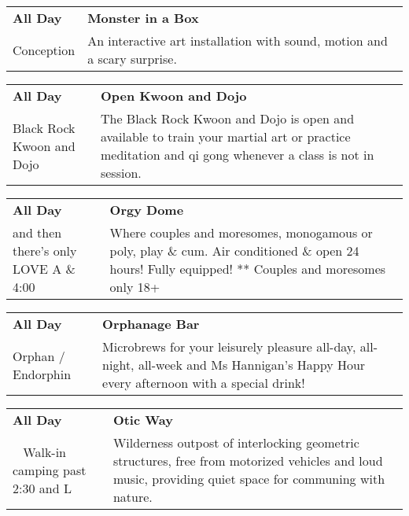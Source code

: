 \begin{tabular}{ p{1in} p{2.2in} }
    \textbf{All Day} & \textbf{Monster in a Box} \\
    Conception \newline  & An interactive art installation with sound, motion and a scary surprise. \\
    \hline 
\end{tabular}
    
\begin{tabular}{ p{1in} p{2.2in} }
    \textbf{All Day} & \textbf{Open Kwoon and Dojo} \\
    Black Rock Kwoon and Dojo \newline  & The Black Rock Kwoon and Dojo is open and available to train your martial art or practice meditation and qi gong whenever a class is not in session. \\
    \hline 
\end{tabular}
    
\begin{tabular}{ p{1in} p{2.2in} }
    \textbf{All Day} & \textbf{Orgy Dome} \\
    and then there's only LOVE \newline A \& 4:00 & Where couples and moresomes, monogamous or poly, play \& cum.  Air conditioned \& open 24 hours! Fully equipped! ** Couples and moresomes only 18+ \\
    \hline 
\end{tabular}
    
\begin{tabular}{ p{1in} p{2.2in} }
    \textbf{All Day} & \textbf{Orphanage Bar} \\
    Orphan / Endorphin \newline  & Microbrews for your leisurely pleasure all-day, all-night, all-week and Ms Hannigan's Happy Hour every afternoon with a special drink! \\
    \hline 
\end{tabular}
    
\begin{tabular}{ p{1in} p{2.2in} }
    \textbf{All Day} & \textbf{Otic Way} \\
    ~ \newline Walk-in camping past 2:30 and L & Wilderness outpost of interlocking geometric structures, free from motorized vehicles and loud music, providing quiet space for communing with nature. \\
    \hline 
\end{tabular}
    

